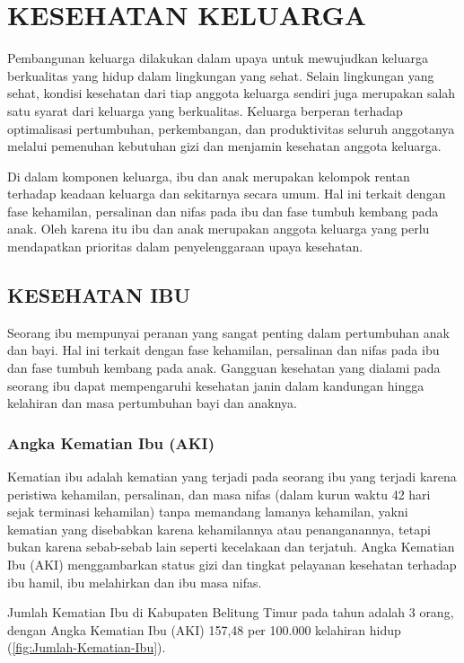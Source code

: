 \chapter{KESEHATAN KELUARGA}
Pembangunan keluarga dilakukan dalam upaya untuk mewujudkan keluarga berkualitas yang hidup dalam lingkungan yang sehat. Selain lingkungan yang sehat, kondisi kesehatan dari tiap anggota keluarga sendiri juga merupakan salah satu syarat dari keluarga yang berkualitas.
Keluarga berperan terhadap optimalisasi pertumbuhan, perkembangan, dan produktivitas seluruh anggotanya melalui pemenuhan kebutuhan gizi dan menjamin kesehatan anggota keluarga. 

Di dalam komponen keluarga, ibu dan anak merupakan kelompok rentan terhadap keadaan keluarga dan sekitarnya secara umum.
Hal ini terkait dengan fase kehamilan, persalinan dan nifas pada ibu dan fase tumbuh kembang pada anak.
Oleh karena itu ibu dan anak merupakan anggota keluarga yang perlu mendapatkan prioritas dalam penyelenggaraan upaya kesehatan.

\section{KESEHATAN IBU}
Seorang ibu mempunyai peranan yang sangat penting dalam pertumbuhan anak dan bayi.
Hal ini terkait dengan fase kehamilan, persalinan dan nifas pada ibu dan fase tumbuh kembang pada anak.
Gangguan kesehatan yang dialami pada seorang ibu dapat mempengaruhi kesehatan janin dalam kandungan hingga kelahiran dan masa pertumbuhan bayi dan anaknya.

\subsection{Angka Kematian Ibu (AKI)}
Kematian ibu adalah kematian yang terjadi pada seorang ibu yang terjadi karena peristiwa kehamilan, persalinan, dan masa nifas (dalam kurun waktu 42 hari sejak terminasi kehamilan) tanpa memandang lamanya kehamilan, yakni kematian yang disebabkan karena kehamilannya atau penanganannya, tetapi bukan karena sebab-sebab lain seperti kecelakaan dan terjatuh.
Angka Kematian Ibu (AKI) menggambarkan status gizi dan tingkat pelayanan kesehatan terhadap ibu hamil, ibu melahirkan dan ibu masa nifas.

Jumlah Kematian Ibu di Kabupaten Belitung Timur pada tahun \tP adalah 3 orang, dengan Angka Kematian Ibu (AKI) 157,48 per 100.000 kelahiran hidup (\autoref{fig:Jumlah-Kematian-Ibu}). 

